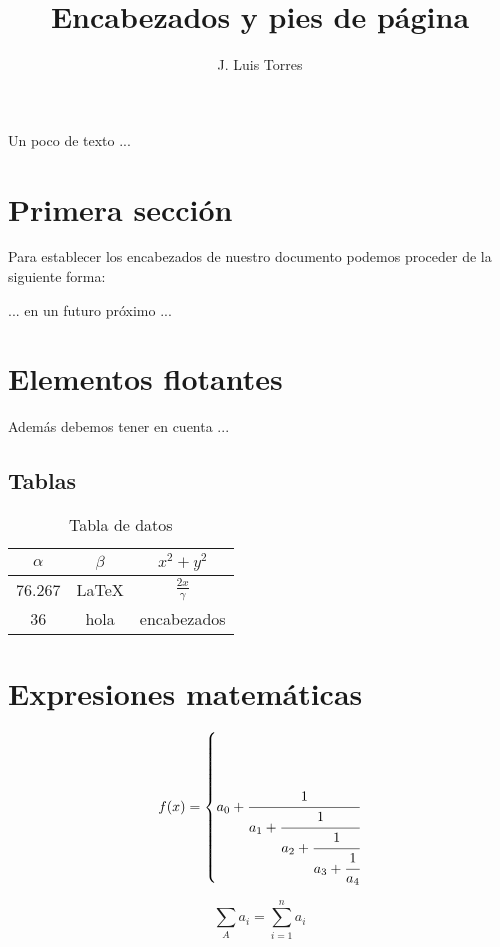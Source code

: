 \documentclass[letterpaper,12pt]{article}
\title{Encabezados y pies de página}
\author{J. Luis Torres}
\begin{document}
\layout{}
\newpage

\maketitle

Un poco de texto ...

\section{Primera sección}

Para establecer los encabezados de nuestro documento podemos proceder de la siguiente forma:

... en un futuro próximo ...

\newpage

\section{Elementos flotantes}

Además debemos tener en cuenta ...

\subsection{Tablas}

\begin{table}[h!]
	\centering
	\begin{tabular}{|c|c|c|}
		\hline 
		$\alpha$ & $\beta$ & $x^2+y^2$ \\ 
		\hline 
		76.267 & \LaTeX & $\frac{2x}{\gamma}$ \\ 
		\hline 
		36 & hola & encabezados \\ 
		\hline 
	\end{tabular} 
	\caption{Tabla de datos}
\end{table}

\newpage

\section{Expresiones matemáticas}

\[ f(x) = \left\{ a_0 + \cfrac{1}{a_1 + \cfrac{1}{a_2 + \cfrac{1}{a_3 + \cfrac{1}{a_4} } } } \right. \]

$$\sum_{A} a_i = \sum_{i=1}^n a_i $$
\end{document}

